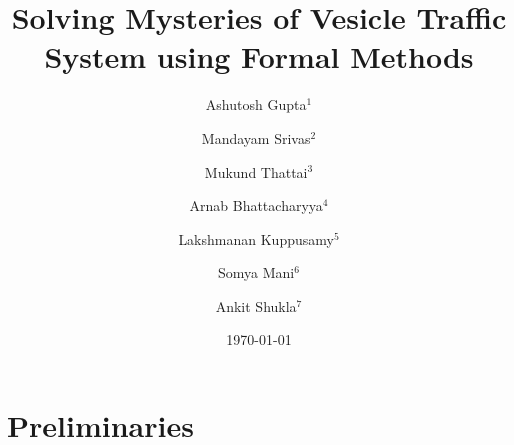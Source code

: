 \documentclass[draft]{llncs}
\begin{document}
\title{Solving Mysteries of Vesicle Traffic System using Formal Methods}

\author{Ashutosh Gupta$^1$ \and Mandayam Srivas$^2$ \and Mukund Thattai$^3$ \and Arnab Bhattacharyya$^4$ \and Lakshmanan Kuppusamy$^5$ \and Somya Mani$^6$ \and Ankit Shukla$^7$ } 


\date{\today}

\maketitle

\begin{abstract}

\end{abstract}

%

\section{Preliminaries}
\label{sec:prelim}


%
%

\appendix
\clearpage
\end{document}
